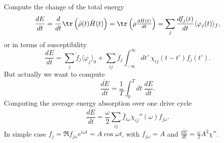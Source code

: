 Compute the
change of
the total
energy
\begin{equation*}
	\frac{d E}{d t}  = \frac{d }{d t} \tr\left( \hat{\rho}(t) \hat{H}(t)\right) = \tr \left(\rho \tfrac{d \hat{H}(t)}{d t} \right) = \sum_j \frac{d f_j(t)}{d t} \langle \varphi_j(t)\rangle_f,
\end{equation*}
or in terms of susceptibility
\begin{equation*}
	\frac{d E}{d t} = \sum_j \dot{f}_j \langle \varphi_j\rangle_0 + \sum_{ij} \dot{f}_j \int_{-\infty}^{\infty} dt'\ \chi_{ij}(t-t') f_j(t').
\end{equation*}
But actually we want to compute
\begin{equation*}
	\overline{\frac{d E}{d t} } = \frac{1}{T} \int_{0}^{T} dt\ \frac{d E}{d t} .
\end{equation*}
Computing the average energy absorption over one drive cycle
\begin{equation*}
	\overline{\frac{d E}{d t} } = \frac{\omega}{2} \sum_{ij} \bar{f}_{i \omega} \chi_{ij}''(\omega) f_{j \omega}.
\end{equation*}
In simple case $f_j = \Re f_{j \omega} e^{i \omega t} = A \cos \omega t$, with $f_{j \omega} = A$ and  $\overline{\frac{d E}{d t} } = \frac{\omega}{2} A^2 \chi''$.


